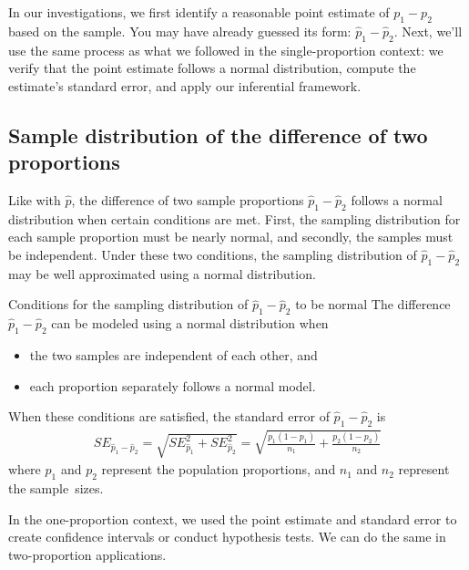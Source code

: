 In our investigations, we first identify a reasonable
point estimate of $p_1 - p_2$ based on the sample.
You may have already guessed its form:
$\hat{p}_1 - \hat{p}_2$.
Next, we'll use the same process as
what we followed in the
single-proportion context:
we verify that the point estimate
follows a normal distribution,
compute the estimate's standard error, and
apply our inferential framework.


\subsection{Sample distribution of the difference of two proportions}

Like with $\hat{p}$, the difference of two sample proportions
$\hat{p}_1 - \hat{p}_2$ follows a normal distribution when
certain conditions are met.
First, the sampling distribution for each sample
proportion must be nearly normal, and secondly,
the samples must be independent.
Under these two conditions, the sampling distribution
of $\hat{p}_1 - \hat{p}_2$ may be well approximated
using a normal distribution.

\begin{onebox}{Conditions for the
    sampling distribution of $\hat{p}_1 - \hat{p}_2$
    to be normal}
  The difference $\hat{p}_1 - \hat{p}_2$ can be modeled
  using a normal distribution when
  \begin{itemize}
  \setlength{\itemsep}{0mm}
  \item the two samples are independent of each other, and
  \item each proportion separately follows a normal model.
  \end{itemize}
  When these conditions are satisfied,
  the standard error of $\hat{p}_1 - \hat{p}_2$ is
  \begin{eqnarray*}
  SE_{\hat{p}_1 - \hat{p}_2}
    = \sqrt{SE_{\hat{p}_1}^2 + SE_{\hat{p}_2}^2}
    = \sqrt{\frac{p_1(1-p_1)}{n_1} + \frac{p_2(1-p_2)}{n_2}}
  \label{seForDiffOfProp}
  \end{eqnarray*}
  where $p_1$ and $p_2$ represent the population proportions,
  and $n_1$ and $n_2$ represent the sample~sizes.
\end{onebox}

In the one-proportion context, we used the point estimate
and standard error to create confidence intervals or conduct
hypothesis tests.
We can do the same in two-proportion applications.

